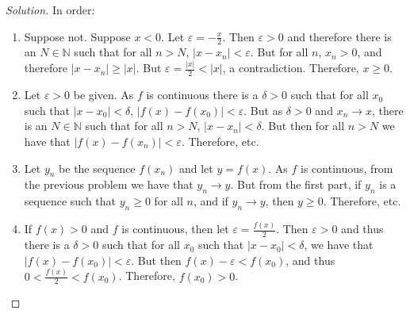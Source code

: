 \documentclass[crop=false,class=article,oneside]{standalone}
\begin{document}
        \begin{proof}[Solution]
            In order:
            \begin{enumerate}
                \item Suppose not. Suppose $x<0$.
                      Let $\varepsilon=-\frac{x}{2}$. Then
                      $\varepsilon>0$ and therefore there is
                      an $N\in\mathbb{N}$ such that for all
                      $n>N$, $|x-x_{n}|<\varepsilon$. But
                      for all $n$, $x_{n}>0$, and therefore
                      $|x-x_{n}|\geq|x|$.
                      But $\varepsilon=\frac{|x|}{2}<|x|$,
                      a contradiction. Therefore, $x\geq{0}$.
                \item Let $\varepsilon>0$ be given. As
                      $f$ is continuous there is a $\delta>0$
                      such that for all $x_{0}$ such that
                      $|x-x_{0}|<\delta$,
                      $|f(x)-f(x_0)|<\varepsilon$. But as
                      $\delta>0$ and $x_{n}\rightarrow{x}$,
                      there is an $N\in\mathbb{N}$ such that
                      for all $n>N$, $|x-x_{n}|<\delta$.
                      But then for all $n>N$ we have that
                      $|f(x)-f(x_{n})|<\varepsilon$.
                      Therefore, etc.
                \item Let $y_{n}$ be the sequence
                      $f(x_{n})$ and let $y=f(x)$.
                      As $f$ is continuous,
                      from the previous problem we have that
                      $y_{n}\rightarrow{y}$. But from the
                      first part, if $y_{n}$ is a sequence
                      such that $y_{n}\geq{0}$ for all $n$,
                      and if $y_{n}\rightarrow{y}$, then
                      $y\geq{0}$. Therefore, etc.
                \item If $f(x)>0$ and $f$ is continuous, then
                      let $\varepsilon=\frac{f(x)}{2}$. Then
                      $\varepsilon>0$ and thus there is a
                      $\delta>0$ such that for all $x_{0}$
                      such that $|x-x_{0}|<\delta$, we have
                      that $|f(x)-f(x_{0})|<\varepsilon$.
                      But then
                      $f(x)-\varepsilon<f(x_{0})$,
                      and thus $0<\frac{f(x)}{2}<f(x_{0})$.
                      Therefore, $f(x_{0})>0$.
            \end{enumerate}
        \end{proof}
\end{document}
